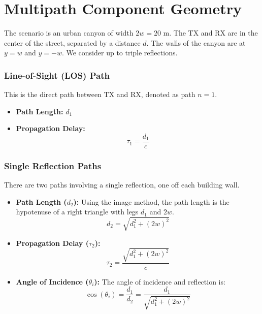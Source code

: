\section{Multipath Component Geometry}
The scenario is an urban canyon of width $2w = 20$ m. The TX and RX are in the center of the street, separated by a distance $d$. The walls of the canyon are at $y = w$ and $y = -w$. We consider up to triple reflections.

\subsubsection{Line-of-Sight (LOS) Path}
This is the direct path between TX and RX, denoted as path $n=1$.
\begin{itemize}
	\item \textbf{Path Length:} $d_1$
	\item \textbf{Propagation Delay:}
	\begin{equation}
		\tau_1 = \frac{d_1}{c}
	\end{equation}
\end{itemize}

\subsubsection{Single Reflection Paths}
There are two paths involving a single reflection, one off each building wall.
\begin{itemize}
	\item \textbf{Path Length ($d_2$):} Using the image method, the path length is the hypotenuse of a right triangle with legs $d_1$ and $2w$.
	\begin{equation}
		d_2 = \sqrt{d_1^2 + (2w)^2}
	\end{equation}
	\item \textbf{Propagation Delay ($\tau_{2}$):}
	\begin{equation}
		\tau_{2} = \frac{\sqrt{d_1^2 + (2w)^2}}{c}
	\end{equation}
	\item \textbf{Angle of Incidence ($\theta_{i}$):} The angle of incidence and reflection is:
	\begin{equation}
		\cos(\theta_{i}) = \frac{d_1}{d_2} = \frac{d_1}{\sqrt{d_1^2 + (2w)^2}}
	\end{equation}
\end{itemize}

